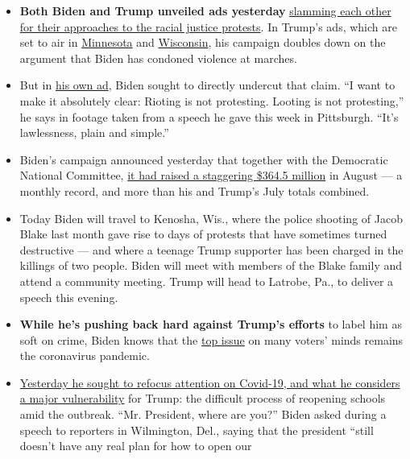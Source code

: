\begin{itemize}
\item
  \textbf{Both Biden and Trump unveiled ads yesterday}
  \href{https://www.nytimes3xbfgragh.onion/2020/09/02/us/politics/biden-ads-trump.html}{slamming
  each other for their approaches to the racial justice protests}. In
  Trump's ads, which are set to air in
  \href{https://youtu.be/Vx6_jhXhL54}{Minnesota} and
  \href{https://youtu.be/JTfDgCCpXTE}{Wisconsin}, his campaign doubles
  down on the argument that Biden has condoned violence at marches.
\item
  But in
  \href{https://www.youtube.com/watch?v=LgHXJ3rdOn0\&feature=youtu.be}{his
  own ad}, Biden sought to directly undercut that claim. ``I want to
  make it absolutely clear: Rioting is not protesting. Looting is not
  protesting,'' he says in footage taken from a speech he gave this week
  in Pittsburgh. ``It's lawlessness, plain and simple.''
\item
  Biden's campaign announced yesterday that together with the Democratic
  National Committee,
  \href{https://www.nytimes3xbfgragh.onion/live/2020/09/02/us/trump-vs-biden/biden-shatters-fund-raising-records-with-a-364-5-million-haul-in-august}{it
  had raised a staggering \$364.5 million} in August --- a monthly
  record, and more than his and Trump's July totals combined.
\item
  Today Biden will travel to Kenosha, Wis., where the police shooting of
  Jacob Blake last month gave rise to days of protests that have
  sometimes turned destructive --- and where a teenage Trump supporter
  has been charged in the killings of two people. Biden will meet with
  members of the Blake family and attend a community meeting. Trump will
  head to Latrobe, Pa., to deliver a speech this evening.
\item
  \textbf{While he's pushing back hard against Trump's efforts} to label
  him as soft on crime, Biden knows that the
  \href{https://news.gallup.com/poll/1675/most-important-problem.aspx}{top
  issue} on many voters' minds remains the coronavirus pandemic.
\item
  \href{https://www.nytimes3xbfgragh.onion/2020/09/02/us/politics/biden-schools-trump-coronavirus.html}{Yesterday
  he sought to refocus attention on Covid-19, and what he considers a
  major vulnerability} for Trump: the difficult process of reopening
  schools amid the outbreak. ``Mr. President, where are you?'' Biden
  asked during a speech to reporters in Wilmington, Del., saying that
  the president ``still doesn't have any real plan for how to open our

\end{itemize}
